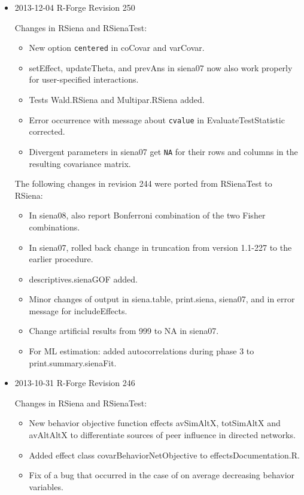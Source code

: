 \documentclass[a4paper,fleqn,11pt]{article}
\newcommand{\+}{\, + \,}
\newcommand{\sfn}[1]{\textsf{#1}}
\begin{document}
\begin{small}
\begin{itemize}
\item 2013-12-04 R-Forge Revision 250

Changes in \textsf{RSiena} and \textsf{RSienaTest}:
\begin{itemize}
\item New option \texttt{centered} in \sfn{coCovar} and \sfn{varCovar}.
\item \sfn{setEffect}, \sfn{updateTheta}, and \sfn{prevAns} in \sfn{siena07}
     now also work properly for user-specified interactions.
\item Tests \sfn{Wald.RSiena} and \sfn{Multipar.RSiena} added.
\item Error occurrence with message about \texttt{cvalue} in
      \sfn{EvaluateTestStatistic} corrected.
\item Divergent parameters in \sfn{siena07} get \texttt{NA} for their rows and columns
     in the resulting covariance matrix.
\end{itemize}
The following changes in revision 244 were ported from \textsf{RSienaTest} to RSiena:
\begin{itemize}
\item In \sfn{siena08}, also report Bonferroni combination
     of the two Fisher combinations.
\item In \sfn{siena07}, rolled back change in truncation from version 1.1-227
     to the earlier procedure.
\item \sfn{descriptives.sienaGOF} added.
\item Minor changes of output in \textsf{siena.table}, \sfn{print.siena},
    \textsf{siena07}, and in error message for \sfn{includeEffects}.
\item Change artificial results from 999 to NA in \sfn{siena07}.
\item For ML estimation: added autocorrelations during phase 3
     to \sfn{print.summary.sienaFit}.
\end{itemize}

\item 2013-10-31 R-Forge Revision 246

Changes in \textsf{RSiena} and \textsf{RSienaTest}:
\begin{itemize}
   \item New behavior objective function effects \sfn{avSimAltX}, \sfn{totSimAltX} and
    \sfn{avAltAltX} to differentiate sources of peer influence in directed networks.
   \item Added effect class \sfn{covarBehaviorNetObjective} to \sfn{effectsDocumentation.R}.
   \item Fix of a bug that occurred in the case of on average decreasing behavior variables.
  \end{itemize}


\end{itemize}
\end{small}
\end{document}
